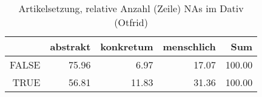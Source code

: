 \begin{table}[ht]
\centering
\begin{tabular}{rrrrr}
  \hline
 & abstrakt & konkretum & menschlich & Sum \\ 
  \hline
FALSE & 75.96 & 6.97 & 17.07 & 100.00 \\ 
  TRUE & 56.81 & 11.83 & 31.36 & 100.00 \\ 
   \hline
\end{tabular}
\caption{Artikelsetzung, relative Anzahl (Zeile) NAs im Dativ (Otfrid)} 
\end{table}

